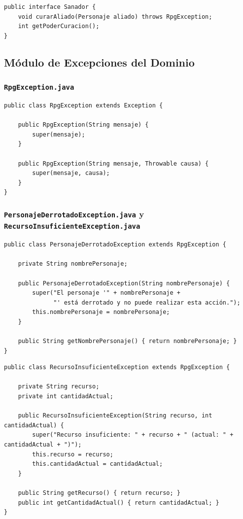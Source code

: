 \documentclass[11pt,letterpaper]{article}
\begin{document}
\begin{lstlisting}[style=JavaStyle]
public interface Sanador {
    void curarAliado(Personaje aliado) throws RpgException;
    int getPoderCuracion();
}
\end{lstlisting}

\subsection{Módulo de Excepciones del Dominio}

\subsubsection{\texttt{RpgException.java}}
\begin{lstlisting}[style=JavaStyle]
public class RpgException extends Exception {

    public RpgException(String mensaje) {
        super(mensaje);
    }

    public RpgException(String mensaje, Throwable causa) {
        super(mensaje, causa);
    }
}
\end{lstlisting}

\subsubsection{\texttt{PersonajeDerrotadoException.java} y \texttt{RecursoInsuficienteException.java}}
\begin{lstlisting}[style=JavaStyle]
public class PersonajeDerrotadoException extends RpgException {

    private String nombrePersonaje;

    public PersonajeDerrotadoException(String nombrePersonaje) {
        super("El personaje '" + nombrePersonaje +
              "' está derrotado y no puede realizar esta acción.");
        this.nombrePersonaje = nombrePersonaje;
    }

    public String getNombrePersonaje() { return nombrePersonaje; }
}
\end{lstlisting}

\begin{lstlisting}[style=JavaStyle]
public class RecursoInsuficienteException extends RpgException {

    private String recurso;
    private int cantidadActual;

    public RecursoInsuficienteException(String recurso, int cantidadActual) {
        super("Recurso insuficiente: " + recurso + " (actual: " + cantidadActual + ")");
        this.recurso = recurso;
        this.cantidadActual = cantidadActual;
    }

    public String getRecurso() { return recurso; }
    public int getCantidadActual() { return cantidadActual; }
}
\end{lstlisting}
\end{document}
